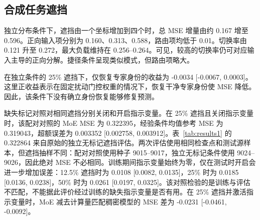 \documentclass[10pt,letterpaper]{article}
\begin{document}
\subsection{合成任务遮挡}

独立分布条件下，遮挡由一个坐标增加到四个时，总 MSE 增量由约 0.167 增至 0.596。正向输入项分别为 0.160、0.313、0.588，路由项均低于 0.01。切换率由 0.121 升至 0.272，最大负载维持在 0.256--0.264。可见，较高的切换率仍可对应输入主导的正向分解。捷径条件呈现类似模式，但路由项略大。


\begin{table}[!htbp]
\centering
\caption{捷径分布下的信息丢失效应。输入、路由、总变化均为原始 MSE 增量，切换率为专家身份变化比例。遮挡指示变量保持为零。}
\label{tab:results4}
\small
\setlength{\tabcolsep}{4pt}
\renewcommand{\arraystretch}{1.1}
\ifdim\wd\reporttablebox>\linewidth
\resizebox{\linewidth}{!}{\usebox{\reporttablebox}}
\else\usebox{\reporttablebox}\fi
\end{table}


在独立条件的 25\% 遮挡下，仅恢复专家身份的收益为 -0.0034 [-0.0067, 0.0003]。这里正收益表示在固定扰动门控权重的情况下，恢复干净专家身份使 MSE 降低。因此，该条件下没有确立身份恢复能够修复预测。


缺失标记对照对相同遮挡分别关闭和开启指示变量。在 25\% 遮挡且关闭指示变量时，该配对对照的 MoE MSE 为 0.322395，经验条件均值参考 MSE 为 0.319043，超额误差为 0.003352 [0.002758, 0.003912]。表~\ref{tab:results1} 的 0.322864 来自原始的独立无标记遮挡评估。两次评估使用相同检查点和测试源样本，但遮挡抽样不同：配对对照使用种子 9015--9017，独立无标记条件使用 9024--9026，因此绝对 MSE 不必相同。训练期间指示变量始终为零，仅在测试时开启会进一步增加误差：12.5\% 遮挡时为 0.0108 [0.0082, 0.0135]，25\% 时为 0.0185 [0.0136, 0.0238]，50\% 时为 0.0261 [0.0197, 0.0325]。该对照检验的是训练与评估不匹配，不能据此评价经过训练的缺失指示变量是否有用。在 25\% 遮挡并激活指示变量时，MoE 减去计算量匹配稠密模型的 MSE 差为 -0.0231 [-0.0461, -0.0092]。
\end{document}
